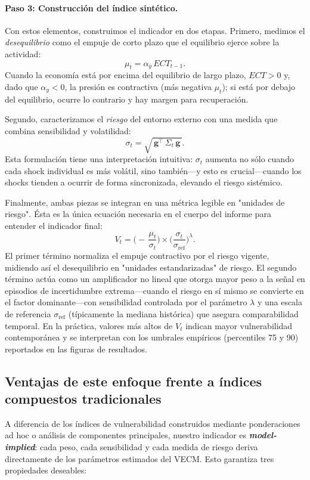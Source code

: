 \documentclass[11pt,a4paper]{article}
\numberwithin{equation}{section}
\newcommand{\vect}[1]{\boldsymbol{#1}}
\begin{document}
\paragraph{Paso 3: Construcción del índice sintético.}
Con estos elementos, construimos el indicador en dos etapas. Primero, medimos el \textit{desequilibrio} como el empuje de corto plazo que el equilibrio ejerce sobre la actividad:
$$
\mu_t = \alpha_y \, ECT_{t-1}.
$$
Cuando la economía está por encima del equilibrio de largo plazo, $ECT>0$ y, dado que $\alpha_y<0$, la presión es contractiva (más negativa $\mu_t$); si está por debajo del equilibrio, ocurre lo contrario y hay margen para recuperación.

Segundo, caracterizamos el \textit{riesgo} del entorno externo con una medida que combina sensibilidad y volatilidad:
$$
\sigma_t = \sqrt{\,\vect{g}^{\top}\, \Sigma_t \,\vect{g}\,}.
$$
Esta formulación tiene una interpretación intuitiva: $\sigma_t$ aumenta no sólo cuando cada shock individual es más volátil, sino también—y esto es crucial—cuando los shocks tienden a ocurrir de forma sincronizada, elevando el riesgo sistémico.

Finalmente, ambas piezas se integran en una métrica legible en "unidades de riesgo". Ésta es la única ecuación necesaria en el cuerpo del informe para entender el indicador final:
$$
V_t = \Big(-\,\frac{\mu_t}{\sigma_t}\Big)\times\Big(\frac{\sigma_t}{\sigma_{\text{ref}}}\Big)^{\lambda}.
$$
El primer término normaliza el empuje contractivo por el riesgo vigente, midiendo así el desequilibrio en "unidades estandarizadas" de riesgo. El segundo término actúa como un amplificador no lineal que otorga mayor peso a la señal en episodios de incertidumbre extrema—cuando el riesgo en sí mismo se convierte en el factor dominante—con sensibilidad controlada por el parámetro $\lambda$ y una escala de referencia $\sigma_{\text{ref}}$ (típicamente la mediana histórica) que asegura comparabilidad temporal. En la práctica, valores más altos de $V_t$ indican mayor vulnerabilidad contemporánea y se interpretan con los umbrales empíricos (percentiles 75 y 90) reportados en las figuras de resultados.

\subsection{Ventajas de este enfoque frente a índices compuestos tradicionales}

A diferencia de los índices de vulnerabilidad construidos mediante ponderaciones ad hoc o análisis de componentes principales, nuestro indicador es \textbf{\textit{model-implied}}: cada peso, cada sensibilidad y cada medida de riesgo deriva directamente de los parámetros estimados del VECM. Esto garantiza tres propiedades deseables:
\end{document}
